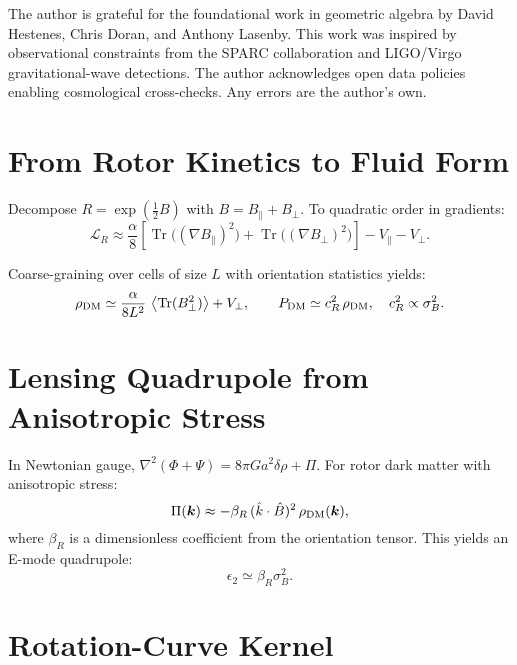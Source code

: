 \documentclass[11pt,a4paper]{article}
\numberwithin{equation}{section}
\theoremstyle{plain}
\theoremstyle{definition}
\theoremstyle{remark}
\DeclareMathOperator{\Tr}{Tr}
\newcommand{\avg}[1]{\left\langle #1 \right\rangle}
\newcommand{\Lag}{\mathcal{L}}              %
\begin{document}
The author is grateful for the foundational work in geometric algebra by David Hestenes, Chris Doran, and Anthony Lasenby. This work was inspired by observational constraints from the SPARC collaboration and LIGO/Virgo gravitational-wave detections. The author acknowledges open data policies enabling cosmological cross-checks. Any errors are the author's own.

\vspace{1em}

\appendix

\section{From Rotor Kinetics to Fluid Form}\label{app:fluid}

Decompose $R=\exp(\tfrac12 B)$ with $B=B_\parallel+B_\perp$. To quadratic order in gradients:
\begin{equation}
\Lag_R \approx \frac{\alpha}{8}\left[\Tr\big((\nabla B_\parallel)^2\big)+\Tr\big((\nabla B_\perp)^2\big)\right]-V_\parallel - V_\perp.
\end{equation}

Coarse-graining over cells of size $L$ with orientation statistics yields:
\begin{equation}
\rho_{\rm DM} \simeq \frac{\alpha}{8L^2}\,\avg{\Tr(B_\perp^2)} + V_\perp,
\qquad
P_{\rm DM}\simeq c_R^2\,\rho_{\rm DM},\quad c_R^2\propto \sigma_B^2.
\end{equation}

\section{Lensing Quadrupole from Anisotropic Stress}\label{app:lensing}

In Newtonian gauge, $\nabla^2(\Phi+\Psi)=8\pi G a^2 \delta\rho + \Pi$. For rotor dark matter with anisotropic stress:
\begin{equation}
\Pi(\bm{k})\approx -\beta_R\,(\hat k\cdot \hat B)^2\,\rho_{\rm DM}(\bm{k}),
\end{equation}
where $\beta_R$ is a dimensionless coefficient from the orientation tensor. This yields an E-mode quadrupole:
\begin{equation}
\epsilon_2\simeq\beta_R \sigma_B^2.
\end{equation}

\section{Rotation-Curve Kernel}\label{app:rc}
\end{document}
